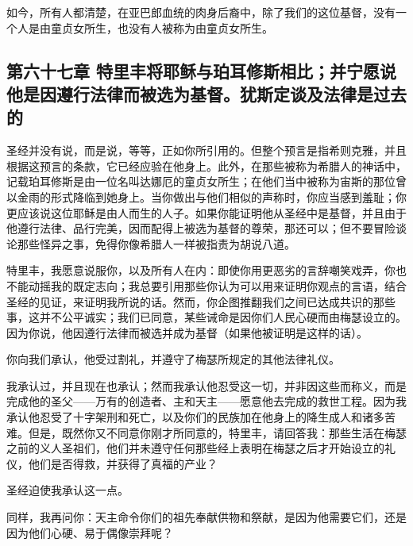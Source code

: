 如今，所有人都清楚，在亚巴郎血统的肉身后裔中，除了我们的这位基督，没有一个人是由童贞女所生，也没有人被称为由童贞女所生。\par


\subsection{第六十七章 特里丰将耶稣与珀耳修斯相比；并宁愿说他是因遵行法律而被选为基督。犹斯定谈及法律是过去的}

圣经并没有说，而是说，等等，正如你所引用的。但整个预言是指希则克雅，并且根据这预言的条款，它已经应验在他身上。此外，在那些被称为希腊人的神话中，记载珀耳修斯是由一位名叫达娜厄的童贞女所生；在他们当中被称为宙斯的那位曾以金雨的形式降临到她身上。当你做出与他们相似的声称时，你应当感到羞耻；你更应该说这位耶稣是由人而生的人子。如果你能证明他从圣经中是基督，并且由于他遵行法律、品行完美，因而配得上被选为基督的尊荣，那还可以；但不要冒险谈论那些怪异之事，免得你像希腊人一样被指责为胡说八道。\par

特里丰，我愿意说服你，以及所有人在内：即使你用更恶劣的言辞嘲笑戏弄，你也不能动摇我的既定志向；我总要引用那些你认为可以用来证明你观点的言语，结合圣经的见证，来证明我所说的话。然而，你企图推翻我们之间已达成共识的那些事，这并不公平诚实；我们已同意，某些诫命是因你们人民心硬而由梅瑟设立的。因为你说，他因遵行法律而被选并成为基督（如果他被证明是这样的话）。\par

你向我们承认，他受过割礼，并遵守了梅瑟所规定的其他法律礼仪。\par

我承认过，并且现在也承认；然而我承认他忍受这一切，并非因这些而称义，而是完成他的圣父——万有的创造者、主和天主——愿意他去完成的救世工程。因为我承认他忍受了十字架刑和死亡，以及你们的民族加在他身上的降生成人和诸多苦难。但是，既然你又不同意你刚才所同意的，特里丰，请回答我：那些生活在梅瑟之前的义人圣祖们，他们并未遵守任何那些经上表明在梅瑟之后才开始设立的礼仪，他们是否得救，并获得了真福的产业？\par

圣经迫使我承认这一点。\par

同样，我再问你：天主命令你们的祖先奉献供物和祭献，是因为他需要它们，还是因为他们心硬、易于偶像崇拜呢？\par

